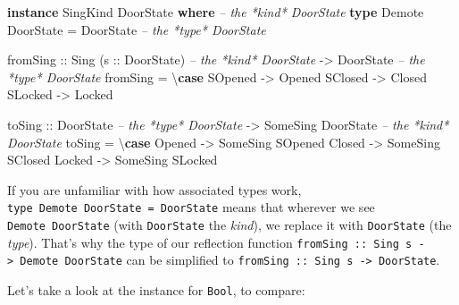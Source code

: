 \documentclass[]{article}
\newenvironment{Shaded}{}{}
\newcommand{\CommentTok}[1]{\textcolor[rgb]{0.38,0.63,0.69}{\textit{#1}}}
\newcommand{\DataTypeTok}[1]{\textcolor[rgb]{0.56,0.13,0.00}{#1}}
\newcommand{\KeywordTok}[1]{\textcolor[rgb]{0.00,0.44,0.13}{\textbf{#1}}}
\newcommand{\NormalTok}[1]{#1}
\newcommand{\OtherTok}[1]{\textcolor[rgb]{0.00,0.44,0.13}{#1}}
\begin{document}
\begin{Shaded}
\begin{Highlighting}[]
\KeywordTok{instance} \DataTypeTok{SingKind} \DataTypeTok{DoorState} \KeywordTok{where}       \CommentTok{-- the *kind* DoorState}
    \KeywordTok{type} \DataTypeTok{Demote} \DataTypeTok{DoorState} \OtherTok{=} \DataTypeTok{DoorState}   \CommentTok{-- the *type* DoorState}

\NormalTok{    fromSing}
\OtherTok{        ::} \DataTypeTok{Sing}\NormalTok{ (}\OtherTok{s ::} \DataTypeTok{DoorState}\NormalTok{)        }\CommentTok{-- the *kind* DoorState}
        \OtherTok{->} \DataTypeTok{DoorState}                    \CommentTok{-- the *type* DoorState}
\NormalTok{    fromSing }\OtherTok{=}\NormalTok{ \textbackslash{}}\KeywordTok{case}
        \DataTypeTok{SOpened} \OtherTok{->} \DataTypeTok{Opened}
        \DataTypeTok{SClosed} \OtherTok{->} \DataTypeTok{Closed}
        \DataTypeTok{SLocked} \OtherTok{->} \DataTypeTok{Locked}

\NormalTok{    toSing}
\OtherTok{        ::} \DataTypeTok{DoorState}                    \CommentTok{-- the *type* DoorState}
        \OtherTok{->} \DataTypeTok{SomeSing} \DataTypeTok{DoorState}           \CommentTok{-- the *kind* DoorState}
\NormalTok{    toSing }\OtherTok{=}\NormalTok{ \textbackslash{}}\KeywordTok{case}
        \DataTypeTok{Opened} \OtherTok{->} \DataTypeTok{SomeSing} \DataTypeTok{SOpened}
        \DataTypeTok{Closed} \OtherTok{->} \DataTypeTok{SomeSing} \DataTypeTok{SClosed}
        \DataTypeTok{Locked} \OtherTok{->} \DataTypeTok{SomeSing} \DataTypeTok{SLocked}
\end{Highlighting}
\end{Shaded}

If you are unfamiliar with how associated types work,
\texttt{type\ Demote\ DoorState\ =\ DoorState} means that wherever we see
\texttt{Demote\ DoorState} (with \texttt{DoorState} the \emph{kind}), we replace
it with \texttt{DoorState} (the \emph{type}). That's why the type of our
reflection function
\texttt{fromSing\ ::\ Sing\ s\ -\textgreater{}\ Demote\ DoorState} can be
simplified to \texttt{fromSing\ ::\ Sing\ s\ -\textgreater{}\ DoorState}.

Let's take a look at the instance for \texttt{Bool}, to compare:
\end{document}
